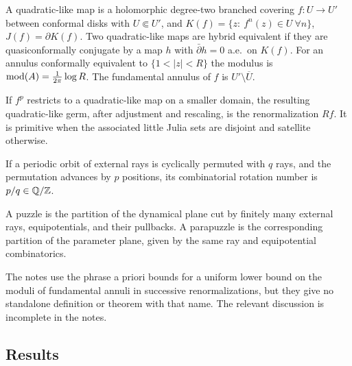 \begin{definition}
\label{def:lyubich-ql}
A quadratic-like map is a holomorphic degree-two branched covering $f\colon U\to U'$
between conformal disks with $U\Subset U'$, and $K(f)=\{z:\ f^n(z)\in U\ \forall n\}$,
$J(f)=\partial K(f)$.  Two quadratic-like maps are hybrid equivalent if they are
quasiconformally conjugate by a map $h$ with $\bar\partial h=0$ a.e.\ on $K(f)$.
For an annulus conformally equivalent to $\{1<|z|<R\}$ the modulus is
$\operatorname{mod}(A)=\frac{1}{2\pi}\log R$.  The fundamental annulus of $f$ is $U'\setminus\overline U$.
\end{definition}

\begin{definition}
\label{def:lyubich-renorm}
If $f^p$ restricts to a quadratic-like map on a smaller domain, the resulting
quadratic-like germ, after adjustment and rescaling, is the renormalization $Rf$.  It
is primitive when the associated little Julia sets are disjoint and satellite otherwise.
\end{definition}

\begin{definition}
\label{def:lyubich-rotation}
If a periodic orbit of external rays is cyclically permuted with $q$ rays, and the
permutation advances by $p$ positions, its combinatorial rotation number is $p/q\in\mathbb Q/\mathbb Z$.
\end{definition}

\begin{definition}
\label{def:lyubich-puzzle}
A puzzle is the partition of the dynamical plane cut by finitely many external rays,
equipotentials, and their pullbacks.  A parapuzzle is the corresponding partition of
the parameter plane, given by the same ray and equipotential combinatorics.
\end{definition}

\begin{remark}
The notes use the phrase a priori bounds for a uniform lower bound on the moduli of
fundamental annuli in successive renormalizations, but they give no standalone
definition or theorem with that name.  The relevant discussion is incomplete in the notes.
\end{remark}

\subsection*{Results}

